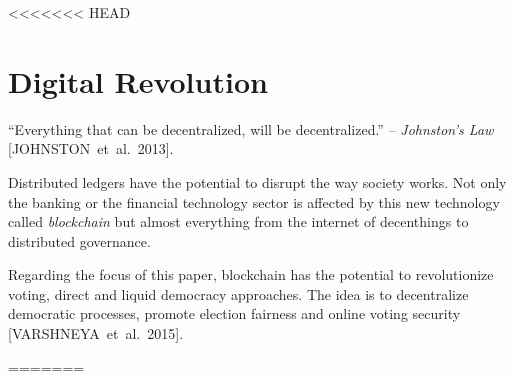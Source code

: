 \documentclass[9pt,oneside]{amsart}
\begin{document}
\setlength{\columnsep}{20pt}
\begin{multicols}{2}

<<<<<<< HEAD
\section{Digital Revolution}\label{sec:motivation}


\enquote{Everything that can be decentralized, will be decentralized.} -- \textit{Johnston's Law} [JOHNSTON~et~al.~2013].\par
Distributed ledgers have the potential to disrupt the way society works. Not only the banking or the financial technology sector is affected by this new technology called \textit{blockchain} but almost everything from the internet of decenthings to distributed governance.\par
Regarding the focus of this paper, blockchain has the potential to revolutionize voting, direct and liquid democracy approaches. The idea is to decentralize democratic processes, promote election fairness and online voting security [VARSHNEYA~et~al.~2015].\par
=======

\end{multicols}
\end{document}
